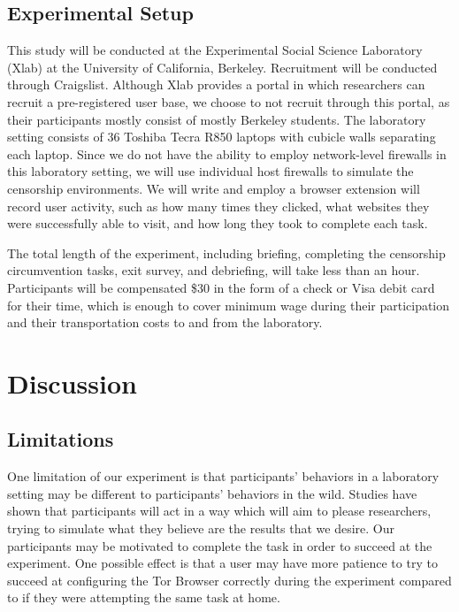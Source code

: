 \documentclass[letterpaper,twocolumn,11pt]{article}
\begin{document}
\subsection{Experimental Setup} 

\indent\indent This study will be conducted at the Experimental Social Science Laboratory (Xlab)
at the University of California, Berkeley. Recruitment will be conducted through Craigslist. 
Although Xlab provides a portal in which researchers can recruit a pre-registered user base,
we choose to not recruit through this portal, as their participants mostly consist of mostly Berkeley 
students. The laboratory setting consists of 36 Toshiba Tecra R850 laptops with cubicle walls 
separating each laptop. Since we do not have the ability to employ network-level firewalls in this
laboratory setting, we will use individual host firewalls to simulate the censorship environments.  
We will write and employ a browser extension will record user activity, such as how many times they 
clicked, what websites they were successfully able to visit, and how long they took to complete 
each task. 

The total length of the experiment, including briefing, completing the censorship circumvention tasks, 
exit survey, and debriefing, will take less than an hour. Participants will be compensated \$30 in the form
of a check or Visa debit card for their time, which is enough to cover minimum wage during their participation 
and their transportation costs to and from the laboratory. 

\section{Discussion} 

\subsection{Limitations}
\indent \indent One limitation of our experiment is that participants' behaviors in a laboratory setting may
be different to participants' behaviors in the wild. Studies have shown that participants will act in a way which 
will aim to please researchers, trying to simulate what they believe are the results that we desire. Our participants
may be motivated to complete the task in order to succeed at the experiment. One possible effect is that a user
may have more patience to try to succeed at configuring the Tor Browser correctly during the experiment 
compared to if they were attempting the same task at home. 
\end{document}
